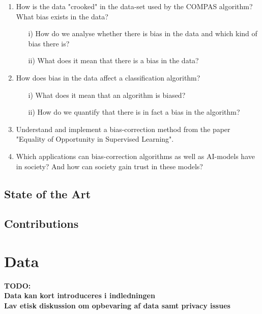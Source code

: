 \documentclass[11pt, fleqn, titlepage]{article}
\begin{document}
	\begin{enumerate}
		\item How is the data "crooked" in the data-set used by the COMPAS algorithm? What bias exists in the data?
		\begin{itemize}
			\item[i)] How do we analyse whether there is bias in the data and which kind of bias there is? 
			\item[ii)] What does it mean that there is a bias in the data?
		\end{itemize}
		
		\item How does bias in the data affect a classification algorithm?
		\begin{itemize}
			\item[i)] What does it mean that an algorithm is biased?
			\item[ii)] How do we quantify that there is in fact a bias in the algorithm?
		\end{itemize}
		
		\item Understand and implement a bias-correction method from the paper "Equality of Opportunity in Supervised Learning". 
		
		\item Which applications can bias-correction algorithms as well as AI-models have in society? And how can society gain trust in these models? 
	\end{enumerate}
	
	\subsection{State of the Art}
	
	
	\subsection{Contributions}

	
	
	\section{Data}
	\textbf{TODO: \\ Data kan kort introduceres i indledningen \\ Lav etisk diskussion om opbevaring af data samt privacy issues}
	
\end{document}

